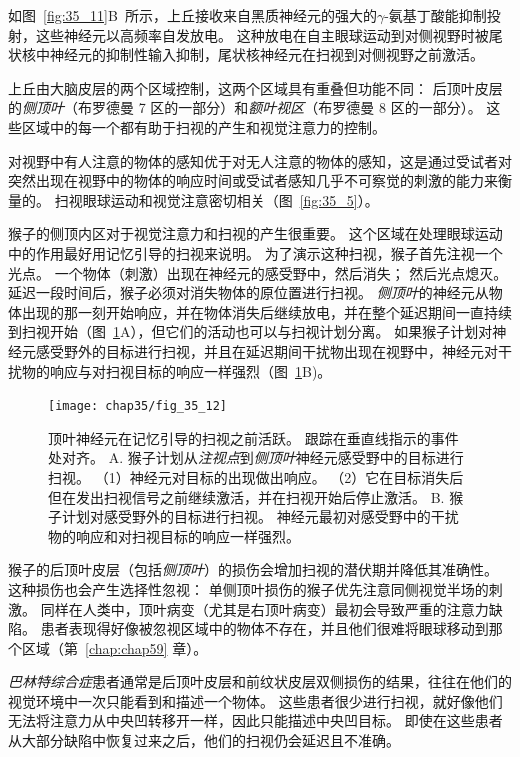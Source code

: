 如图~\ref{fig:35_11}B~所示，上丘接收来自黑质神经元的强大的$\gamma$-氨基丁酸能抑制投射，这些神经元以高频率自发放电。
这种放电在自主眼球运动到对侧视野时被尾状核中神经元的抑制性输入抑制，尾状核神经元在扫视到对侧视野之前激活。


上丘由大脑皮层的两个区域控制，这两个区域具有重叠但功能不同：
后顶叶皮层的\textit{侧顶叶}（布罗德曼 7 区的一部分）和\textit{额叶视区}（布罗德曼 8 区的一部分）。 
这些区域中的每一个都有助于扫视的产生和视觉注意力的控制。


对视野中有人注意的物体的感知优于对无人注意的物体的感知，这是通过受试者对突然出现在视野中的物体的响应时间或受试者感知几乎不可察觉的刺激的能力来衡量的。
扫视眼球运动和视觉注意密切相关（图~\ref{fig:35_5}）。


猴子的侧顶内区对于视觉注意力和扫视的产生很重要。
这个区域在处理眼球运动中的作用最好用记忆引导的扫视来说明。
为了演示这种扫视，猴子首先注视一个光点。
一个物体（刺激）出现在神经元的感受野中，然后消失；
然后光点熄灭。
延迟一段时间后，猴子必须对消失物体的原位置进行扫视。
\textit{侧顶叶}的神经元从物体出现的那一刻开始响应，并在物体消失后继续放电，并在整个延迟期间一直持续到扫视开始（图~\ref{fig:35_12}A），但它们的活动也可以与扫视计划分离。
如果猴子计划对神经元感受野外的目标进行扫视，并且在延迟期间干扰物出现在视野中，神经元对干扰物的响应与对扫视目标的响应一样强烈（图~\ref{fig:35_12}B)。


\begin{figure}[htbp]
	\centering
	\texttt{[image: chap35/fig\_35\_12]}
	\caption{顶叶神经元在记忆引导的扫视之前活跃。
		跟踪在垂直线指示的事件处对齐\cite{powell2000response}。
		A. 猴子计划从\textit{注视点}到\textit{侧顶叶}神经元感受野中的目标进行扫视。
		（1）神经元对目标的出现做出响应。
		（2）它在目标消失后但在发出扫视信号之前继续激活，并在扫视开始后停止激活。
		B. 猴子计划对感受野外的目标进行扫视。
		神经元最初对感受野中的干扰物的响应和对扫视目标的响应一样强烈。}
	\label{fig:35_12}
\end{figure}



猴子的后顶叶皮层（包括\textit{侧顶叶}）的损伤会增加扫视的潜伏期并降低其准确性。
这种损伤也会产生选择性忽视：
单侧顶叶损伤的猴子优先注意同侧视觉半场的刺激。
同样在人类中，顶叶病变（尤其是右顶叶病变）最初会导致严重的注意力缺陷。
患者表现得好像被忽视区域中的物体不存在，并且他们很难将眼球移动到那个区域（第~\ref{chap:chap59} 章）。


\textit{巴林特综合症}患者通常是后顶叶皮层和前纹状皮层双侧损伤的结果，往往在他们的视觉环境中一次只能看到和描述一个物体。
这些患者很少进行扫视，就好像他们无法将注意力从中央凹转移开一样，因此只能描述中央凹目标。
即使在这些患者从大部分缺陷中恢复过来之后，他们的扫视仍会延迟且不准确。


